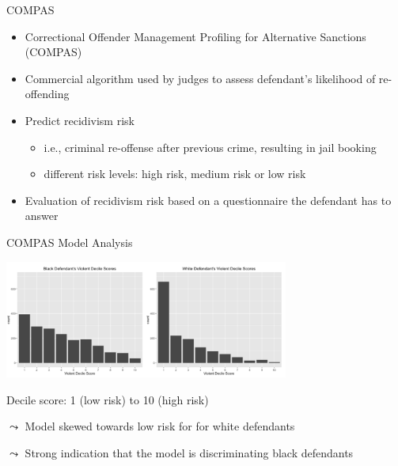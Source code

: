 \documentclass[11pt,compress,t,notes=noshow, aspectratio=169, xcolor=table]{beamer}
\begin{document}





\begin{frame}{COMPAS}

    \begin{itemize}
        \item Correctional Offender Management Profiling for Alternative Sanctions (COMPAS)
        \item Commercial algorithm used by judges to assess defendant’s likelihood of re-offending
        \item Predict recidivism risk
        \begin{itemize}
            \item i.e., criminal re-offense after previous crime, resulting in jail booking
            \item different risk levels: high risk, medium risk or low risk
        \end{itemize}
        \item Evaluation of recidivism risk based on a questionnaire the defendant has to answer
    \end{itemize}

\end{frame}

\begin{frame}{COMPAS Model Analysis~}

    \centering
    \includegraphics[width=0.7\textwidth]{figure/compass_black_white.PNG}

    Decile score: 1 (low risk) to 10 (high risk)

	$\leadsto$ Model skewed towards low risk for for white defendants
	
	$\leadsto$ Strong indication that the model is discriminating black defendants

\end{frame}
\end{document}

